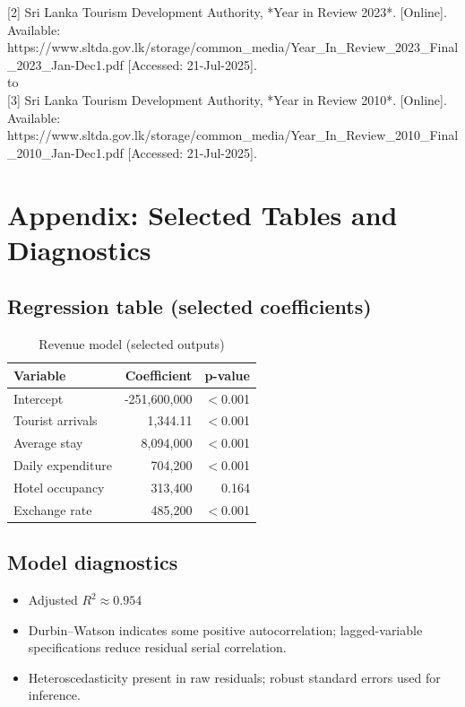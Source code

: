 \documentclass[12pt,a4paper]{article}
\begin{document}
[2] Sri Lanka Tourism Development Authority, *Year in Review 2023*. [Online]. Available: https://www.sltda.gov.lk/storage/common_media/Year_In_Review_2023_Final_2023_Jan-Dec1.pdf [Accessed: 21-Jul-2025].\\

to \\

[3] Sri Lanka Tourism Development Authority, *Year in Review 2010*. [Online]. Available: https://www.sltda.gov.lk/storage/common_media/Year_In_Review_2010_Final_2010_Jan-Dec1.pdf [Accessed: 21-Jul-2025].\\



\newpage
\appendix
\section{Appendix: Selected Tables and Diagnostics}

\subsection{Regression table (selected coefficients)}
\begin{table}[H]
\centering
\caption{Revenue model (selected outputs)}
\begin{tabular}{lrr}
\toprule
Variable & Coefficient & p-value \\
\midrule
Intercept & -251,600,000 & $<$0.001 \\
Tourist arrivals & 1,344.11 & $<$0.001 \\
Average stay & 8,094,000 & $<$0.001 \\
Daily expenditure & 704,200 & $<$0.001 \\
Hotel occupancy & 313,400 & 0.164 \\
Exchange rate & 485,200 & $<$0.001 \\
\bottomrule
\end{tabular}
\end{table}

\vspace{6pt}
\subsection{Model diagnostics}
\begin{itemize}
  \item Adjusted \(R^2 \approx 0.954\)
  \item Durbin--Watson indicates some positive autocorrelation; lagged-variable specifications reduce residual serial correlation.
  \item Heteroscedasticity present in raw residuals; robust standard errors used for inference.
\end{itemize}
\end{document}
